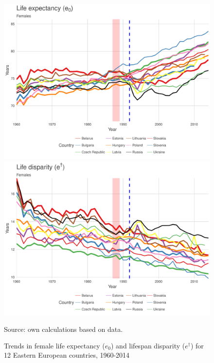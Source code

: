 \documentclass{article}
\begin{document}
\begin{figure}[h!]
\centering
\caption{Trends in female life expectancy ($e_0$) and lifespan disparity  ($e^{\dagger}$) for 12 Eastern European countries, 1960-2014}
\begin{center}
\includegraphics[scale=.40]{Figures/ex_females_labels.pdf}
\includegraphics[scale=.40]{Figures/ed_females_labels.pdf}
\end{center}
Source: own calculations based on \citet{HMD} data. 
\end{figure}

\newpage
\end{document}
